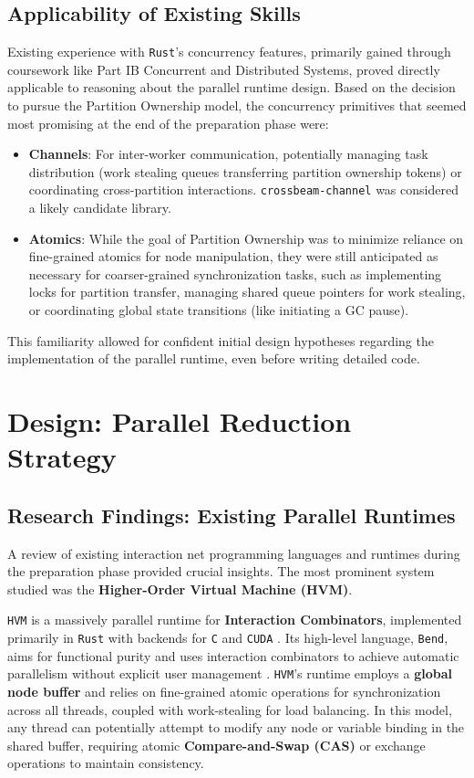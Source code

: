 \subsection{Applicability of Existing Skills}
Existing experience with \texttt{Rust}'s concurrency features, primarily gained through coursework like Part IB Concurrent and Distributed Systems, proved directly applicable to reasoning about the parallel runtime design. Based on the decision to pursue the Partition Ownership model, the concurrency primitives that seemed most promising at the end of the preparation phase were:
\begin{itemize}
    \item \textbf{Channels}: For inter-worker communication, potentially managing task distribution (work stealing queues transferring partition ownership tokens) or coordinating cross-partition interactions. \texttt{crossbeam-channel} was considered a likely candidate library.
    \item \textbf{Atomics}: While the goal of Partition Ownership was to minimize reliance on fine-grained atomics for node manipulation, they were still anticipated as necessary for coarser-grained synchronization tasks, such as implementing locks for partition transfer, managing shared queue pointers for work stealing, or coordinating global state transitions (like initiating a GC pause).
\end{itemize}
This familiarity allowed for confident initial design hypotheses regarding the implementation of the parallel runtime, even before writing detailed code.

\section{Design: Parallel Reduction Strategy}\label{sec:prep_design_parallel}

\subsection{Research Findings: Existing Parallel Runtimes}
A review of existing interaction net programming languages and runtimes during the preparation phase provided crucial insights. The most prominent system studied was the \textbf{Higher-Order Virtual Machine (HVM)}.

\texttt{HVM} is a massively parallel runtime for \textbf{Interaction Combinators}, implemented primarily in \texttt{Rust} with backends for \texttt{C} and \texttt{CUDA} \cite{HVMGithub}. Its high-level language, \texttt{Bend}, aims for functional purity and uses interaction combinators to achieve automatic parallelism without explicit user management \cite{BendGithub}. \texttt{HVM}'s runtime employs a \textbf{global node buffer} and relies on fine-grained atomic operations for synchronization across all threads, coupled with work-stealing for load balancing. In this model, any thread can potentially attempt to modify any node or variable binding in the shared buffer, requiring atomic \textbf{Compare-and-Swap (CAS)} or exchange operations to maintain consistency.

